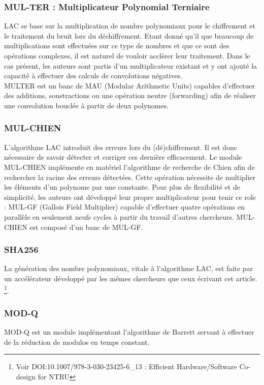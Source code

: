 \documentclass[10pt,a4paper]{article}
\begin{document}
\subsubsection{MUL-TER : Multiplicateur Polynomial Terniaire}
LAC se base sur la multiplication de nombre polynomiaux pour le chiffrement et le traitement du bruit lors du déchiffrement. Etant donné qu'il que beaucoup de multiplications sont effectuées 
sur ce type de nombres et que ce sont des opérations complexes, il est naturel de vouloir acclèrer leur traitement. Dans le cas présent, les auteurs sont partis d'un multiplicateur existant et y ont 
ajouté la capacité à effectuer des calculs de convolutions négatives. \\
MULTER est un banc de MAU (Modular Arithmetic Units) capables d'effectuer des additions, soustractions ou une opération neutre (forwarding) afin de réaliser une convolution bouclée à partir de deux polynomes.

\subsubsection{MUL-CHIEN}
L'algorithme LAC introduit des erreurs lors du (dé)chiffrement. Il est donc nécessaire de savoir détecter et corriger ces dernière efficacement. Le module MUL-CHIEN implémente en matériel 
l'algorithme de recherche de Chien afin de rechercher la racine des erreurs détectées. Cette opération nécessite de multiplier les éléments d'un polynome par une constante. Pour plus de flexibilité et 
de simplicité, les auteurs ont développé leur propre multiplicateur pour tenir ce role : MUL-GF (Gallois Field Multiplier) capable d'effectuer quatre opérations en parallèle en seulement neufs cycles à partir du travail 
d'autres chercheurs. MUL-CHIEN est composé d'un banc de MUL-GF.

\subsubsection{SHA256}
La génération des nombre polynomiaux, vitale à l'algorithme LAC, est faite par un accélérateur développé par les mêmes chercheurs que ceux écrivant cet article. 
\footnote{Voir DOI:10.1007/978-3-030-23425-6\_13 : Efficient Hardware/Software Co-design for NTRU}.
\subsubsection{MOD-Q}
MOD-Q est un module implémentant l'algorithme de Barrett servant à effectuer de la réduction de modulos en temps constant. 
\end{document}

